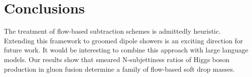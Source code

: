 \section{Conclusions}\label{sec:conclusions}

The treatment of flow-based subtraction schemes is admittedly heuristic.
Extending this framework to groomed dipole showers is an exciting
direction for future work. It would be interesting to combine this
approach with large language models. Our results show that smeared
N-subjettiness ratios of Higgs boson production in gluon fusion
determine a family of flow-based soft drop masses.

